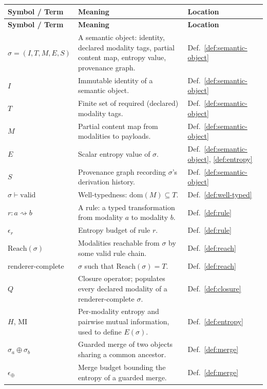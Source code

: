 \documentclass[11pt]{article}
\theoremstyle{definition}
\begin{document}
\renewcommand{\arraystretch}{1.25}
\begin{longtable}{@{}p{}p{}p{}@{}}
\toprule
\textbf{Symbol / Term} & \textbf{Meaning} & \textbf{Location} \\
\midrule
\endfirsthead
\toprule
\textbf{Symbol / Term} & \textbf{Meaning} & \textbf{Location} \\
\midrule
\endhead
$\sigma = (I,T,M,E,S)$ & A semantic object: identity, declared modality tags, partial content map, entropy value, provenance graph. & Def.~\ref{def:semantic-object} \\
$I$ & Immutable identity of a semantic object. & Def.~\ref{def:semantic-object} \\
$T$ & Finite set of required (declared) modality tags. & Def.~\ref{def:semantic-object} \\
$M$ & Partial content map from modalities to payloads. & Def.~\ref{def:semantic-object} \\
$E$ & Scalar entropy value of $\sigma$. & Def.~\ref{def:semantic-object}, \ref{def:entropy} \\
$S$ & Provenance graph recording $\sigma$'s derivation history. & Def.~\ref{def:semantic-object} \\
$\sigma \vdash \mathrm{valid}$ & Well-typedness: $\mathrm{dom}(M) \subseteq T$. & Def.~\ref{def:well-typed} \\
$r : a \rightsquigarrow b$ & A rule: a typed transformation from modality $a$ to modality $b$. & Def.~\ref{def:rule} \\
$\epsilon_r$ & Entropy budget of rule $r$. & Def.~\ref{def:rule} \\
$\mathrm{Reach}(\sigma)$ & Modalities reachable from $\sigma$ by some valid rule chain. & Def.~\ref{def:reach} \\
renderer-complete & $\sigma$ such that $\mathrm{Reach}(\sigma) = T$. & Def.~\ref{def:reach} \\
$Q$ & Closure operator; populates every declared modality of a renderer-complete $\sigma$. & Def.~\ref{def:closure} \\
$H$, $\mathrm{MI}$ & Per-modality entropy and pairwise mutual information, used to define $E(\sigma)$. & Def.~\ref{def:entropy} \\
$\sigma_a \oplus \sigma_b$ & Guarded merge of two objects sharing a common ancestor. & Def.~\ref{def:merge} \\
$\epsilon_\oplus$ & Merge budget bounding the entropy of a guarded merge. & Def.~\ref{def:merge} \\

\end{longtable}
\end{document}
